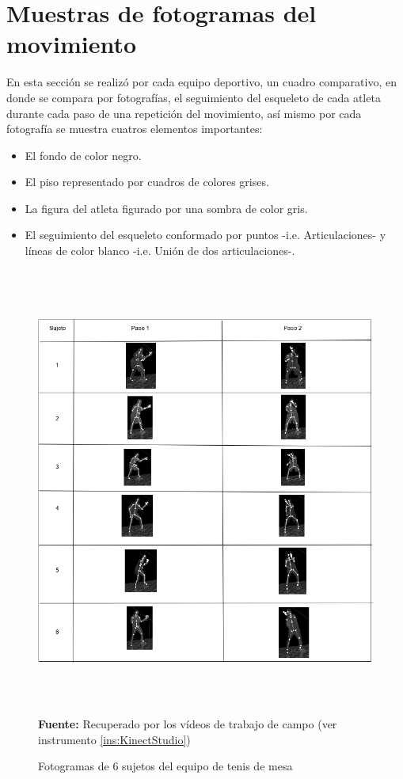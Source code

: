 \section{Muestras de fotogramas del movimiento} \label{res:fotogramas}
En esta secci\'on se realiz\'o por cada equipo deportivo, un cuadro comparativo, en donde se compara por fotograf\'ias, el seguimiento del  esqueleto de cada atleta durante cada paso de una repetici\'on del movimiento, as\'i mismo por cada fotograf\'ia se muestra cuatros elementos importantes:
\begin{itemize}
\item El fondo de color negro.
\item El piso representado por cuadros de colores grises.
\item La figura del atleta figurado por una sombra de color gris.
\item El seguimiento del esqueleto conformado por puntos -i.e. Articulaciones- y l\'ineas de color blanco -i.e. Uni\'on de dos articulaciones-.
\end{itemize}
\begin{figure}[H]
	\caption{Fotogramas de 6 sujetos del equipo de tenis de mesa}
	\label{fig:fotogramaTenis}
	\centering
	\includegraphics[width=445px,height=560px]{graphics/resultados/SETenisDeMesa.PNG} \\
	\textbf{Fuente:} Recuperado por los v\'ideos de trabajo de campo (ver instrumento \ref{ins:KinectStudio})
\end{figure}
